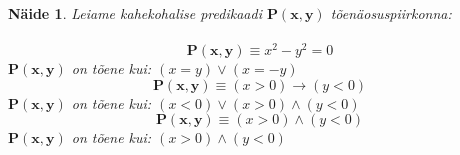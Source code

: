 \documentclass[12pt]{article}
\newtheorem{example}[theorem]{Näide}
\begin{document}
\begin{example} 
	Leiame kahekohalise predikaadi $\mathbf{P(x,y)}$ tõenäosuspiirkonna: \\ 
	\\ 
	\[ 
		\mathbf{P(x,y)} \equiv x^2 - y^2 = 0
		\]
		\textit{$\mathbf{P(x,y)}$ on tõene kui: $(x = y) \vee (x = -y)$} \\
	

	\[
	\mathbf{P(x,y)} \equiv (x > 0) \rightarrow (y < 0)
	\]
	\textit{$\mathbf{P(x,y)}$ on tõene kui: $(x < 0) \vee (x > 0) \wedge (y<0)$} \\

 
	\[ 
	\mathbf{P(x,y)} \equiv (x > 0) \wedge (y < 0) 
	\]
\textit{$\mathbf{P(x,y)}$ on tõene kui: $(x > 0) \wedge (y < 0)$}
\end{example}

\newpage
\end{document}
